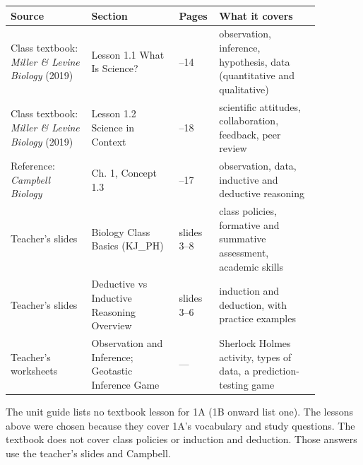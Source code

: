 \documentclass[11pt,letterpaper]{article}
\begin{document}
\begin{longtable}{@{}>{\raggedright\arraybackslash}p{0.24\linewidth}>{\raggedright\arraybackslash}p{0.26\linewidth}>{\raggedright\arraybackslash}p{0.07\linewidth}>{\raggedright\arraybackslash}p{0.30\linewidth}@{}}
\toprule
Source & Section & Pages & What it covers \\
\midrule
\endhead
Class textbook: \emph{Miller \& Levine Biology} (2019) & Lesson 1.1 What Is Science? & 8–14 & observation, inference, hypothesis, data (quantitative and qualitative) \\
Class textbook: \emph{Miller \& Levine Biology} (2019) & Lesson 1.2 Science in Context & 15–18 & scientific attitudes, collaboration, feedback, peer review \\
Reference: \emph{Campbell Biology} & Ch. 1, Concept 1.3 & 16–17 & observation, data, inductive and deductive reasoning \\
Teacher's slides & Biology Class Basics (KJ\_PH) & slides 3–8 & class policies, formative and summative assessment, academic skills \\
Teacher's slides & Deductive vs Inductive Reasoning Overview & slides 3–6 & induction and deduction, with practice examples \\
Teacher's worksheets & Observation and Inference; Geotastic Inference Game & — & Sherlock Holmes activity, types of data, a prediction-testing game \\
\bottomrule
\end{longtable}

The unit guide lists no textbook lesson for 1A (1B onward list one). The lessons above were chosen because they cover 1A's vocabulary and study questions. The textbook does not cover class policies or induction and deduction. Those answers use the teacher's slides and Campbell.

\clearpage

\end{document}
